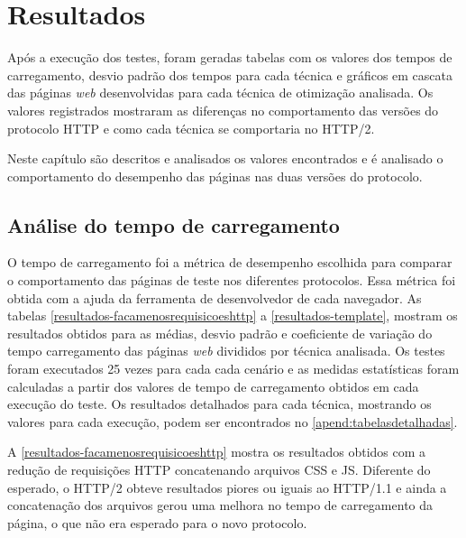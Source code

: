 %
%

\chapter{Resultados}

Após a execução dos testes, foram geradas tabelas com os valores dos tempos de carregamento, desvio padrão dos tempos para cada técnica e gráficos em cascata das páginas \textit{web} desenvolvidas para cada técnica de otimização analisada. Os valores registrados mostraram as diferenças no comportamento das versões do protocolo HTTP e como cada técnica se comportaria no HTTP/2.

Neste capítulo são descritos e analisados os valores encontrados e é analisado o comportamento do desempenho das páginas nas duas versões do protocolo.

\section{Análise do tempo de carregamento}
\label{analisedotempodecarregamento}

O tempo de carregamento foi a métrica de desempenho escolhida para comparar o comportamento das páginas de teste nos diferentes protocolos. Essa métrica foi obtida com a ajuda da ferramenta de desenvolvedor de cada navegador. As tabelas \ref{resultados-facamenosrequisicoeshttp} a \ref{resultados-template}, mostram os resultados obtidos para as médias, desvio padrão e coeficiente de variação do tempo carregamento das páginas \textit{web} divididos por técnica analisada. Os testes foram executados 25 vezes para cada cada cenário e as medidas estatísticas foram calculadas a partir dos valores de tempo de carregamento obtidos em cada execução do teste. Os resultados detalhados para cada técnica, mostrando os valores para cada execução, podem ser encontrados no \autoref{apend:tabelasdetalhadas}.



A \autoref{resultados-facamenosrequisicoeshttp} mostra os resultados obtidos com a redução de requisições HTTP concatenando arquivos CSS e JS. Diferente do esperado, o HTTP/2 obteve resultados piores ou iguais ao HTTP/1.1 e ainda a concatenação dos arquivos gerou uma melhora no tempo de carregamento da página, o que não era esperado para o novo protocolo.




